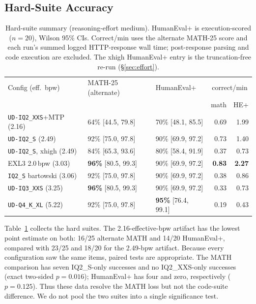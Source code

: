 \documentclass[11pt]{article}
\newcommand{\q}[1]{\texttt{#1}}
\begin{document}
\subsection{Hard-Suite Accuracy}
\label{sec:phase2b}

\begin{table}[t]
\centering
\small
\caption{Hard-suite summary (reasoning-effort medium). HumanEval+ is
execution-scored ($n{=}20$), Wilson 95\% CIs. Correct/min uses the
alternate MATH-25 score and each run's summed logged HTTP-response wall time;
post-response parsing and code execution are excluded.
The xhigh HumanEval+ entry is the truncation-free re-run
(\S\ref{sec:effort}).}
\label{tab:hard}
\setlength{\tabcolsep}{4pt}
\begin{tabular}{lllrr}
\toprule
Config (eff.\ bpw) & MATH-25 (alternate) & HumanEval+ & \multicolumn{2}{c}{correct/min} \\
 & & & math & HE+ \\
\midrule
\q{UD-IQ2\_XXS}+MTP (2.16) & 64\% [44.5, 79.8] & 70\% [48.1, 85.5] & 0.69 & 1.99 \\
\q{UD-IQ2\_S} (2.49) & 92\% [75.0, 97.8] & 90\% [69.9, 97.2] & 0.73 & 1.40 \\
\q{UD-IQ2\_S}, xhigh (2.49) & 84\% [65.3, 93.6] & 80\% [58.4, 91.9] & 0.37 & 0.73 \\
EXL3 2.0\,bpw (3.03) & \textbf{96\%} [80.5, 99.3] & 90\% [69.9, 97.2] & \textbf{0.83} & \textbf{2.27} \\
\q{IQ2\_S} bartowski (3.06) & 92\% [75.0, 97.8] & 90\% [69.9, 97.2] & 0.38 & 0.86 \\
\q{UD-IQ3\_XXS} (3.25) & \textbf{96\%} [80.5, 99.3] & 90\% [69.9, 97.2] & 0.33 & 0.73 \\
\q{UD-Q4\_K\_XL} (5.22) & 92\% [75.0, 97.8] & \textbf{95\%} [76.4, 99.1] & 0.19 & 0.43 \\
\bottomrule
\end{tabular}
\end{table}

Table~\ref{tab:hard} collects the hard suites. The 2.16-effective-bpw artifact
has the lowest point estimate on both: 16/25 alternate MATH and 14/20
HumanEval+, compared with 23/25 and 18/20 for the 2.49-bpw artifact. Because
every configuration saw the same items, paired tests are appropriate. The
MATH comparison has seven IQ2\_S-only successes and no IQ2\_XXS-only successes
(exact two-sided $p{=}0.016$); HumanEval+ has four and zero, respectively
($p{=}0.125$). Thus these data resolve the MATH loss but not the code-suite
difference. We do not pool the two suites into a single significance test.
\end{document}
